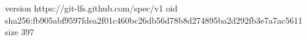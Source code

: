 version https://git-lfs.github.com/spec/v1
oid sha256:fb905abf9597fdea2f01c460bc26db56d78b8d274895ba2d292fb3e7a7ac5611
size 397
